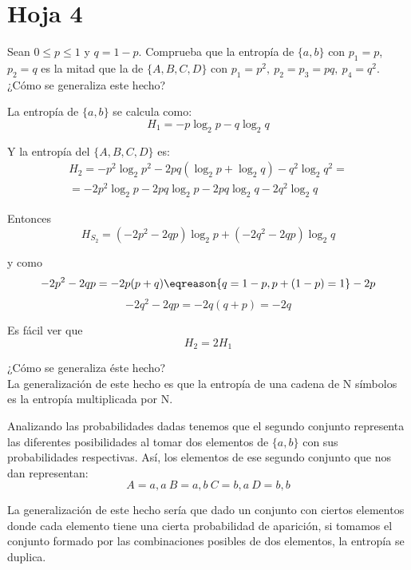 \section{Hoja 4}
\begin{problem}[1]
	Sean $0 \leq p \leq 1$ y $q =1-p$. Comprueba que la entropía de $\{a,b\}$ con $p_1=p$, $p_2=q$ es la mitad que la de $\{A,B,C,D\}$ con $p_1=p^2, \ p_2=p_3=pq, \ p_4=q^2$. ¿Cómo se generaliza este hecho?
	\solution

	La entropía de $\{a,b\}$ se calcula como:
	$$H_1 = -p \log_2 p - q \log_2q$$

	Y la entropía del $\{A,B,C,D\}$ es:
	\begin{gather*}
	H_{2} = -p^2\log_2 p^2 - 2pq(\log_2p + \log_2q) - q^2\log_2 q^2 =\\
	= -2p^2\log_2 p - 2pq\log_2p - 2pq\log_2q - 2q^2\log_2q
	\end{gather*}

	Entonces
	$$H_{S_2}= (-2p^2-2qp)\log_2p + (-2q^2 - 2qp)\log_2q$$

	y como
	$$-2p^2-2qp= -2p(p+q) \eqreason{q=1-p, p+(1-p)=1} -2p$$
	$$-2q^2 - 2qp = -2q(q+p) =-2q$$

	Es fácil ver que $$H_{2} = 2H_1$$

	¿Cómo se generaliza éste hecho?\\
	La generalización de este hecho es que la entropía de una cadena de N símbolos es la entropía multiplicada por N.

	\yoP

	Analizando las probabilidades dadas tenemos que el segundo conjunto representa las diferentes posibilidades al tomar dos elementos de $\{a,b\}$ con sus probabilidades respectivas. Así, los elementos de ese segundo conjunto que nos dan representan:
	\[A= a,a \ B=a,b \ C=b,a \ D=b,b\]

	La generalización de este hecho sería que dado un conjunto con ciertos elementos donde cada elemento tiene una cierta probabilidad de aparición, si tomamos el conjunto formado por las combinaciones posibles de dos elementos, la entropía se duplica.

\end{problem}
